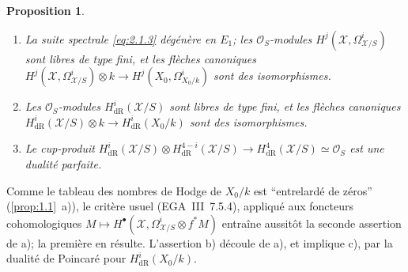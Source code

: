 \documentclass[12pt,a4paper]{article}
\theoremstyle{plain}
\newtheorem{proposition}[theorem]{Proposition}
\theoremstyle{definition}
\theoremstyle{remark}
\begin{document}
\begin{proposition}\label{prop:2.2}
\begin{enumerate}[label=\alph*)]
\item La suite spectrale \eqref{eq:2.1.3} dégénère en $E_1$; les $\mathcal{O}_S$-modules $H^j(\mathcal{X}, \Omega_{\mathcal{X}/S}^i)$ sont libres de type fini, et les flèches canoniques $H^j(\mathcal{X}, \Omega_{\mathcal{X}/S}^i) \otimes k \to H^j(X_0, \Omega_{X_0/k}^i)$ sont des isomorphismes.
\item Les $\mathcal{O}_S$-modules $H^i_{\mathrm{dR}}(\mathcal{X}/S)$ sont libres de type fini, et les flèches canoniques $H^i_{\mathrm{dR}}(\mathcal{X}/S) \otimes k \to H^i_{\mathrm{dR}}(X_0/k)$ sont des isomorphismes.
\item Le cup-produit $H^i_{\mathrm{dR}}(\mathcal{X}/S) \otimes H^{4-i}_{\mathrm{dR}}(\mathcal{X}/S) \to H^4_{\mathrm{dR}}(\mathcal{X}/S) \simeq \mathcal{O}_S$ est une dualité parfaite.
\end{enumerate}
\end{proposition}

Comme le tableau des nombres de Hodge de $X_0/k$ est ``entrelardé de zéros'' (\ref{prop:1.1}~a)), le critère usuel (EGA~III~7.5.4), appliqué aux foncteurs cohomologiques $M \mapsto H^{\bullet}(\mathcal{X}, \Omega_{\mathcal{X}/S}^i \otimes f^* M)$ entraîne aussitôt la seconde assertion de a); la première en résulte. L'assertion b) découle de a), et implique c), par la dualité de Poincaré pour $H^i_{\mathrm{dR}}(X_0/k)$.

\subsection{}
\end{document}

